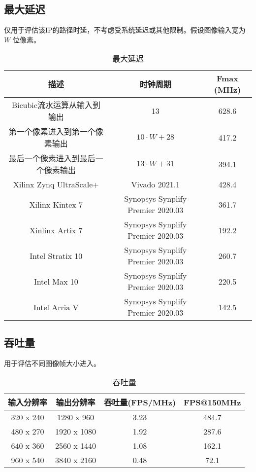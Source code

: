 \documentclass[12pt, a4paper, oneside]{ctexbook}
\begin{document}
		\subsection{最大延迟}
		仅用于评估该IP的路径时延，不考虑受系统延迟或其他限制。假设图像输入宽为 $W$ 位像素。
		\begin{table}[h]
			\centering
			\begin{tabular}{|c|c|c|}
				\hline
				\textbf{描述}             & \textbf{时钟周期}                     & \textbf{Fmax (MHz)} \\ \hline
				Bicubic流水运算从输入到输出       & 13                                & 628.6               \\ \hline
				第一个像素进入到第一个像素输出         & $10\cdot W+28$                    & 417.2               \\ \hline
				最后一个像素进入到最后一个像素输出       & $13\cdot W + 31$                  & 394.1               \\ \hline
				Xilinx Zynq UltraScale+ & Vivado 2021.1                     & 428.4               \\ \hline
				Xilinx Kintex 7         & Synopsys Synplify Premier 2020.03 & 361.7               \\ \hline
				Xinlinx Artix 7         & Synopsys Synplify Premier 2020.03 & 192.2               \\ \hline
				Intel Stratix 10        & Synopsys Synplify Premier 2020.03 & 260.7               \\ \hline
				Intel Max 10            & Synopsys Synplify Premier 2020.03 & 220.5               \\ \hline
				Intel Arria V           & Synopsys Synplify Premier 2020.03 & 142.5               \\ \hline
			\end{tabular}
		\caption{最大延迟}
		\end{table}
		\subsection{吞吐量}
		用于评估不同图像帧大小进入。
		\begin{table}[h]
			\centering
			\begin{tabular}{|c|c|c|c|}
				\hline
				\textbf{输入分辨率} & \textbf{输出分辨率} & \textbf{吞吐量(FPS/MHz)} & \textbf{FPS@150MHz} \\ \hline
				320 x 240      & 1280 x 960     & 3.23                  & 484.7               \\ \hline
				480 x 270      & 1920 x 1080    & 1.92                  & 287.6               \\ \hline
				640 x 360      & 2560 x 1440    & 1.08                  & 162.1               \\ \hline
				960 x 540      & 3840 x 2160    & 0.48                  & 72.1                \\ \hline
			\end{tabular}
		\caption{吞吐量}
		\end{table}
\end{document}
